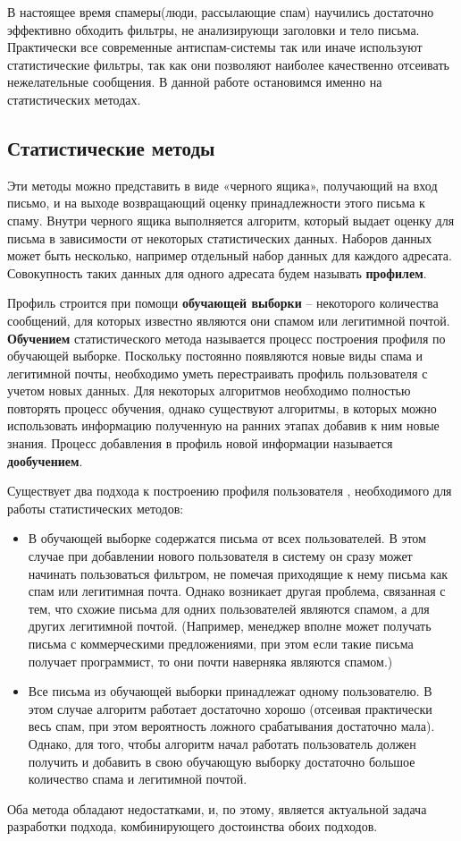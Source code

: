 В настоящее время спамеры(люди, рассылающие спам) научились достаточно эффективно обходить фильтры, не анализирующи заголовки и тело письма. Практически все современные антиспам-системы так или иначе используют статистические фильтры, так как они позволяют наиболее качественно отсеивать нежелательные сообщения. В данной работе остановимся именно на статистических методах.
\subsection{Статистические методы}

Эти методы можно представить в виде «черного ящика», получающий на вход письмо, и на выходе возвращающий оценку принадлежности этого письма к спаму. Внутри черного ящика выполняется алгоритм, который выдает оценку для письма в зависимости от некоторых статистических данных. Наборов данных может быть несколько, например отдельный набор данных для каждого адресата. Совокупность таких данных для одного адресата будем называть \textbf{профилем}.

Профиль строится  при помощи \textbf{обучающей выборки} – некоторого количества сообщений, для которых известно являются они спамом или легитимной почтой. \textbf{Обучением} статистического метода называется процесс построения профиля по обучающей выборке. Поскольку постоянно появляются новые виды спама и легитимной почты, необходимо уметь перестраивать профиль пользователя с учетом новых данных. Для некоторых алгоритмов необходимо полностью повторять процесс обучения, однако существуют алгоритмы, в которых можно использовать информацию полученную на ранних этапах добавив к ним новые знания. Процесс добавления в профиль новой информации называется \textbf{дообучением}.

Существует два подхода к построению профиля пользователя , необходимого для работы статистических методов:

\begin{itemize}
\item В обучающей выборке содержатся письма от всех пользователей. В этом случае при добавлении нового пользователя в систему он сразу может начинать пользоваться фильтром, не помечая приходящие к нему письма как спам или  легитимная почта. Однако возникает другая проблема, связанная с тем, что схожие письма для одних пользователей являются спамом, а для других легитимной почтой. (Например, менеджер вполне может получать письма с коммерческими предложениями, при этом если такие письма получает программист, то они почти наверняка являются спамом.)
\item Все письма из обучающей выборки принадлежат одному пользователю. В этом случае алгоритм работает достаточно хорошо (отсеивая практически весь спам, при этом вероятность ложного срабатывания достаточно мала). Однако, для того, чтобы алгоритм начал работать пользователь должен получить и добавить в свою обучающую выборку достаточно большое количество спама и легитимной почтой.
\end{itemize}
Оба метода обладают недостатками, и, по этому, является актуальной задача разработки подхода, комбинирующего достоинства обоих подходов.


